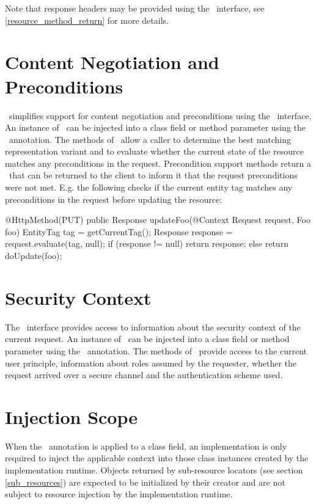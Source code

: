 Note that response headers may be provided using the \Response\ interface, see \ref{resource_method_return} for more details.

\section{Content Negotiation and Preconditions}

\jaxrs\ simplifies support for content negotiation and preconditions using the \Request\ interface. An instance of \Request\ can be injected into a class field or method parameter using the \Context\ annotation. The methods of \Request\ allow a caller to determine the best matching representation variant and to evaluate whether the current state of the resource matches any preconditions in the request. Precondition support methods return a \Response\ that can be returned to the client to inform it that the request preconditions were not met. E.g. the following checks if the current entity tag matches any preconditions in the request before updating the resource:

\begin{listing}{1}
@HttpMethod(PUT)
public Response updateFoo(@Context Request request, Foo foo) {
	EntityTag tag = getCurrentTag();
	Response response = request.evaluate(tag, null);
	if (response != null)
	  return response;
	else
	  return doUpdate(foo);
}
\end{listing}

\section{Security Context}

The \SecurityContext\ interface provides access to information about the security context of the current request. An instance of \SecurityContext\ can be injected into a class field or method parameter using the \Context\ annotation. The methods of \SecurityContext\ provide access to the current user principle, information about roles assumed by the requester, whether the request arrived over a secure channel and the authentication scheme used.

\section{Injection Scope}

When the \Context\ annotation is applied to a class field, an implementation is only required to inject the applicable context into those class instances created by the implementation runtime. Objects returned by sub-resource locators (see section \ref{sub_resources}) are expected to be initialized by their creator and are not subject to resource injection by the implementation runtime.
